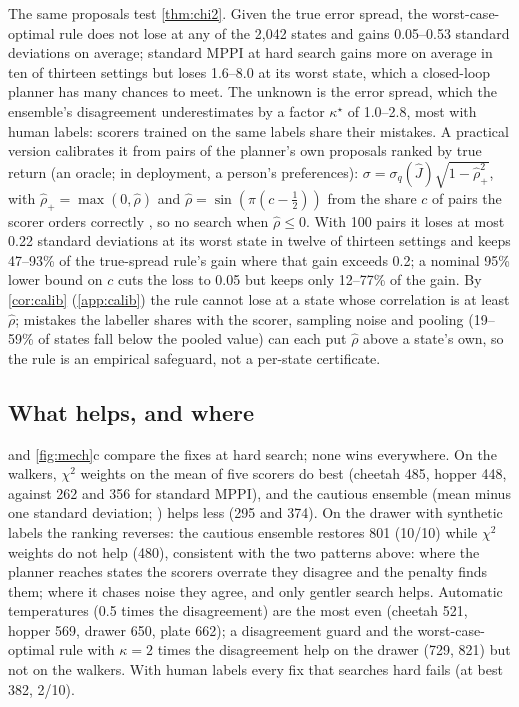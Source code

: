 \documentclass{article}
\theoremstyle{plain}
\theoremstyle{remark}
\newcommand{\Jh}{\hat{J}}
\begin{document}
The same proposals test \cref{thm:chi2}. Given the true error spread, the worst-case-optimal rule does not lose at any of
the 2,042 states and gains 0.05--0.53 standard deviations on average; standard MPPI at hard search gains more on average
in ten of thirteen settings but loses 1.6--8.0 at its worst state, which a closed-loop planner has many chances to meet.
The unknown is the error spread, which the ensemble's disagreement underestimates by a factor $\kappa^\star$
of 1.0--2.8, most with human labels: scorers trained on the same labels share their mistakes. A practical version
calibrates it from pairs of the planner's own proposals ranked by true return (an oracle; in deployment, a person's preferences):
$\sigma=\sigma_q(\Jh)\sqrt{1-\hat\rho_+^2}$, with $\hat\rho_+=\max(0,\hat\rho)$ and $\hat\rho=\sin(\pi(c-\frac12))$
from the share $c$ of pairs the scorer orders correctly \citep{kruskal1958ordinal}, so no search when $\hat\rho\le0$. With 100 pairs it loses at most
0.22 standard deviations at its worst state in twelve of thirteen settings and keeps 47--93\% of the true-spread
rule's gain where that gain exceeds 0.2; a nominal 95\% lower bound on $c$ cuts the loss to 0.05 but keeps only
12--77\% of the gain. By \cref{cor:calib} (\cref{app:calib}) the rule cannot lose at a state whose correlation is at least
$\hat\rho$; mistakes the labeller shares with the scorer, sampling noise and pooling (19--59\% of states fall below the
pooled value) can each put $\hat\rho$ above a state's own, so the rule is an empirical safeguard, not a per-state
certificate.

\subsection{What helps, and where}
\label{sec:exp-fix}



 and \cref{fig:mech}c compare the fixes at hard search; none wins everywhere. On the walkers, $\chi^2$
weights on the mean of five scorers do best (cheetah 485, hopper 448, against 262 and 356 for standard MPPI), and the
cautious ensemble (mean minus one standard deviation; \citealp{coste2024ensembles}) helps less (295 and 374). On the
drawer with synthetic labels the ranking reverses: the cautious ensemble restores 801 (10/10) while $\chi^2$ weights do
not help (480), consistent with the two patterns above: where the planner reaches states the scorers overrate they
disagree and the penalty finds them; where it chases noise they agree, and only gentler search helps. Automatic temperatures (0.5 times
the disagreement) are the most even (cheetah 521, hopper 569, drawer 650, plate 662); a disagreement guard and the
worst-case-optimal rule with $\kappa=2$ times the disagreement help on the drawer (729, 821) but not on the walkers. With human labels every fix that
searches hard fails (at best 382, 2/10).
\end{document}
